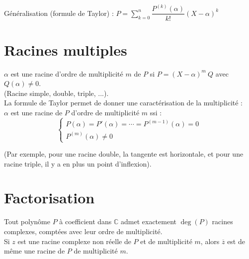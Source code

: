   Généralisation (formule de Taylor) : $\displaystyle P = \sum^n_{k=0} \dfrac{P^{(k)}(\alpha)}{k!} (X-\alpha)^k$


\section{Racines multiples}\label{sec:racines-multiples}
  
  $\alpha$ est une racine d'ordre de multiplicité $m$ de $P$ si $P = (X - \alpha)^m\ Q$ avec $Q(\alpha) \neq 0$.\\
  (Racine simple, double, triple, ...).\\
  
  La formule de Taylor permet de donner une caractérisation de la multiplicité :\\
  $\alpha$ est une racine de $P$ d'ordre de multiplicité $m$ ssi :
  \begin{equation}
    \label{eq:equation}
    \begin{cases}
      P(\alpha) = P'(\alpha) = \cdots = P^{(m-1)}(\alpha) = 0\\
      P^{(m)}(\alpha) \neq 0
    \end{cases}
  \end{equation}
  
  (Par exemple, pour une racine double, la tangente est horizontale, et pour une racine triple, il y a en plus un point d'inflexion).


\section{Factorisation}\label{sec:factorisation}
  
  Tout polynôme $P$ à coefficient dans $\mathbb{C}$ admet exactement $\deg(P)$ racines complexes, comptées avec leur ordre de multiplicité.\\
  
  Si $z$ est une racine complexe non réelle de $P$ et de multiplicité $m$, alors $\overline{z}$ est de même une racine de $P$ de multiplicité $m$.\\